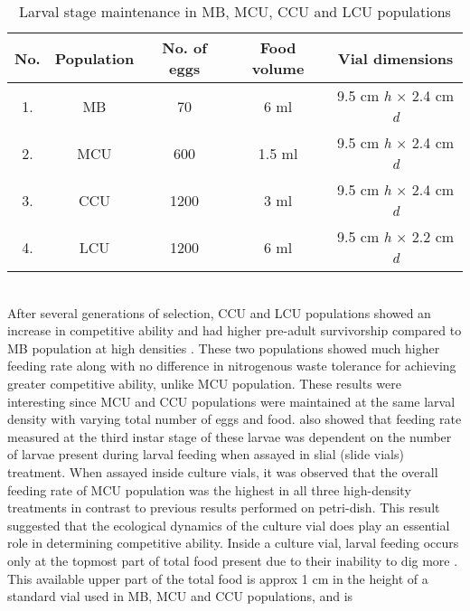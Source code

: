 \begin{table}[h]
  \centering
  \begin{tabular}{|c|c|c|c|c|}
    \hline
    \textbf{No.} & \textbf{Population} & \textbf{No. of eggs} & \textbf{Food volume} & \textbf{Vial dimensions} \\
    \hline
    1. & MB & 70 & 6 ml & 9.5 cm \textit{h} $\times$ 2.4 cm \textit{d} \\
    \hline
    2. & MCU & 600 & 1.5 ml & 9.5 cm \textit{h} $\times$ 2.4 cm \textit{d} \\
    \hline
    3. & CCU & 1200 & 3 ml & 9.5 cm \textit{h} $\times$ 2.4 cm \textit{d} \\
    \hline
    4. & LCU & 1200 & 6 ml & 9.5 cm \textit{h} $\times$ 2.2 cm \textit{d} \\
    \hline
  \end{tabular}
  \caption{Larval stage maintenance in MB, MCU, CCU and LCU populations}
  \label{tab:larval_pop}
\end{table}\\
After several generations of selection, CCU and LCU populations showed an increase in competitive ability and had higher pre-adult survivorship compared to MB population at high densities \citep{sarangiEcologicalDetailsMediate2018}. These two populations showed much higher feeding rate along with no difference in nitrogenous waste tolerance for achieving greater competitive ability, unlike MCU population. These results were interesting since MCU and CCU populations were maintained at the same larval density with varying total number of eggs and food. \citet{sarangiEcologicalDetailsMediate2018} also showed that feeding rate measured at the third instar stage of these larvae was dependent on the number of larvae present during larval feeding when assayed in slial (slide vials) treatment. When assayed inside culture vials, it was observed that the overall feeding rate of MCU population was the highest in all three high-density treatments in contrast to previous results performed on petri-dish. This result suggested that the ecological dynamics of the culture vial does play an essential role in determining competitive ability. Inside a culture vial, larval feeding occurs only at the topmost part of total food present due to their inability to dig more \citep{godoy-herreraInterIntrapopulationalVariation1977}. This available upper part of the total food is approx 1 cm in the height of a standard vial used in MB, MCU and CCU populations, and is
